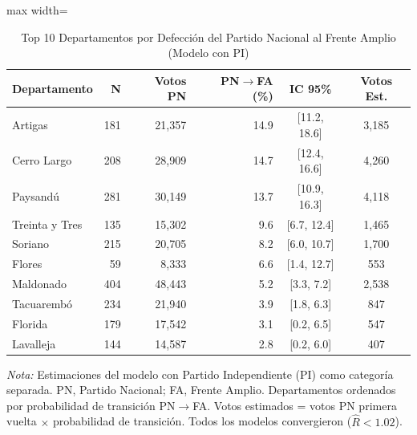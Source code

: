 \begin{table}[H]
\centering
\caption{Top 10 Departamentos por Defección del Partido Nacional al Frente Amplio (Modelo con PI)}
\label{tab:dept_pn_top10}
\small
\begin{adjustbox}{max width=\textwidth}
\begin{tabular}{lrrrcc}
\toprule
\textbf{Departamento} & \textbf{N} & \textbf{Votos PN} & \textbf{PN$\rightarrow$FA (\%)} & \textbf{IC 95\%} & \textbf{Votos Est.} \\
\midrule
Artigas & 181 & 21,357 & 14.9 & [11.2, 18.6] & 3,185 \\
Cerro Largo & 208 & 28,909 & 14.7 & [12.4, 16.6] & 4,260 \\
Paysandú & 281 & 30,149 & 13.7 & [10.9, 16.3] & 4,118 \\
Treinta y Tres & 135 & 15,302 & 9.6 & [6.7, 12.4] & 1,465 \\
Soriano & 215 & 20,705 & 8.2 & [6.0, 10.7] & 1,700 \\
Flores & 59 & 8,333 & 6.6 & [1.4, 12.7] & 553 \\
Maldonado & 404 & 48,443 & 5.2 & [3.3, 7.2] & 2,538 \\
Tacuarembó & 234 & 21,940 & 3.9 & [1.8, 6.3] & 847 \\
Florida & 179 & 17,542 & 3.1 & [0.2, 6.5] & 547 \\
Lavalleja & 144 & 14,587 & 2.8 & [0.2, 6.0] & 407 \\
\bottomrule
\end{tabular}
\end{adjustbox}
\begin{flushleft}
\small \textit{Nota:} Estimaciones del modelo con Partido Independiente (PI) como categoría separada. PN, Partido Nacional; FA, Frente Amplio. Departamentos ordenados por probabilidad de transición PN$\rightarrow$FA. Votos estimados = votos PN primera vuelta $\times$ probabilidad de transición. Todos los modelos convergieron ($\hat{R} < 1.02$).
\end{flushleft}
\end{table}
